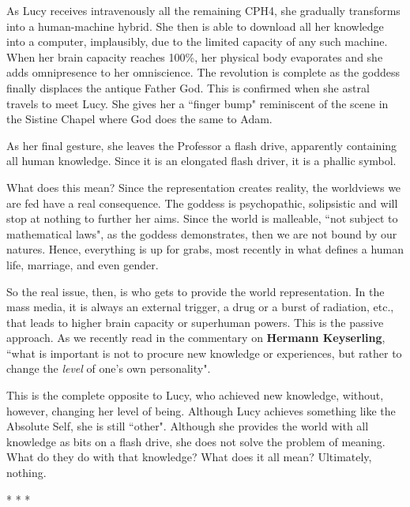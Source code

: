As Lucy receives intravenously all the remaining CPH4, she gradually transforms into a human-machine hybrid. She then is able to download all her knowledge into a computer, implausibly, due to the limited capacity of any such machine. When her brain capacity reaches 100\%, her physical body evaporates and she adds omnipresence to her omniscience. The revolution is complete as the goddess finally displaces the antique Father God. This is confirmed when she astral travels to meet Lucy. She gives her a ``finger bump" reminiscent of the scene in the Sistine Chapel where God does the same to Adam.

As her final gesture, she leaves the Professor a flash drive, apparently containing all human knowledge. Since it is an elongated flash driver, it is a phallic symbol.

What does this mean? Since the representation creates reality, the worldviews we are fed have a real consequence. The goddess is psychopathic, solipsistic and will stop at nothing to further her aims. Since the world is malleable, ``not subject to mathematical laws", as the goddess demonstrates, then we are not bound by our natures. Hence, everything is up for grabs, most recently in what defines a human life, marriage, and even gender.

So the real issue, then, is who gets to provide the world representation. In the mass media, it is always an external trigger, a drug or a burst of radiation, etc., that leads to higher brain capacity or superhuman powers. This is the passive approach. As we recently read in the commentary on \textbf{Hermann Keyserling}, ``what is important is not to procure new knowledge or experiences, but rather to change the \emph{level} of one's own personality".

This is the complete opposite to Lucy, who achieved new knowledge, without, however, changing her level of being. Although Lucy achieves something like the Absolute Self, she is still ``other". Although she provides the world with all knowledge as bits on a flash drive, she does not solve the problem of meaning. What do they do with that knowledge? What does it all mean? Ultimately, nothing.




\begin{center}* * *\end{center}

